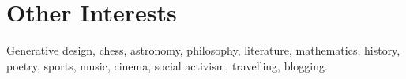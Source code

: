 \documentclass[letterpaper,11pt]{article}
\newcommand{\resumeItem}[2]{
    \item \small{\textbf{#1}{ #2 \vspace{-2pt}}}
}
\newcommand{\resumeSubItem}[2]{\resumeItem{#1}{#2}\vspace{-4pt}}
\newcommand{\resumeSubHeadingListStart}{\begin{itemize}[leftmargin=*]}
\newcommand{\resumeSubHeadingListEnd}{\end{itemize}}
\begin{document}

\section{\faThumbsUp \hspace{0.2cm} \Large Other Interests}

    Generative design, chess, astronomy, philosophy, literature, mathematics, history, poetry, sports, music, cinema, social activism, travelling, blogging.
  
\end{document}
